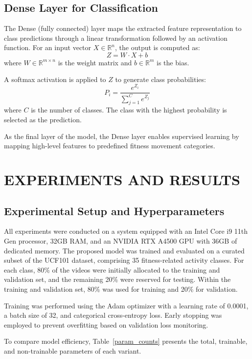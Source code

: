 \documentclass[conference]{IEEEtran}
\begin{document}
\subsection{Dense Layer for Classification}

The Dense (fully connected) layer maps the extracted feature representation to class predictions through a linear transformation followed by an activation function. For an input vector $X \in \mathbb{R}^n$, the output is computed as:
\begin{equation}
Z = W \cdot X + b
\end{equation}
where $W \in \mathbb{R}^{m \times n}$ is the weight matrix and $b \in \mathbb{R}^m$ is the bias.

A softmax activation is applied to $Z$ to generate class probabilities:
\begin{equation}
P_i = \frac{e^{Z_i}}{\sum_{j=1}^C e^{Z_j}}
\end{equation}
where $C$ is the number of classes. The class with the highest probability is selected as the prediction.  

As the final layer of the model, the Dense layer enables supervised learning by mapping high-level features to predefined fitness movement categories.

\section{EXPERIMENTS AND RESULTS}
\subsection{Experimental Setup and Hyperparameters}
All experiments were conducted on a system equipped with an Intel Core i9 11th Gen processor, 32GB RAM, and an NVIDIA RTX A4500 GPU with 36GB of dedicated memory. The proposed model was trained and evaluated on a curated subset of the UCF101 dataset, comprising 35 fitness-related activity classes. For each class, 80\% of the videos were initially allocated to the training and validation set, and the remaining 20\% were reserved for testing. Within the training and validation set, 80\% was used for training and 20\% for validation.

Training was performed using the Adam optimizer with a learning rate of 0.0001, a batch size of 32, and categorical cross-entropy loss. Early stopping was employed to prevent overfitting based on validation loss monitoring.

To compare model efficiency, Table~\ref{param_counts} presents the total, trainable, and non-trainable parameters of each variant.
\end{document}
